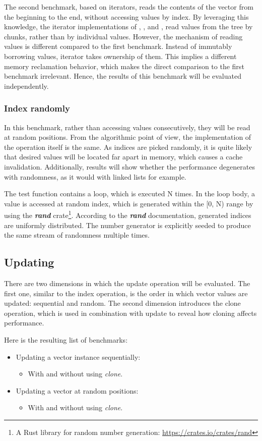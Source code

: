 The second benchmark, based on iterators, reads the contents of the vector from the beginning to the end, without accessing values by index. By leveraging this knowledge, the iterator implementations of \rbvec{}, \rrbvec{}, and \pvec{}, read values from the tree by chunks, rather than by individual values. However, the mechanism of reading values is different compared to the first benchmark. Instead of immutably borrowing values, iterator takes ownership of them. This implies a different memory reclamation behavior, which makes the direct comparison to the first benchmark irrelevant. Hence, the results of this benchmark will be evaluated independently. 

\subsubsection*{Index randomly}
In this benchmark, rather than accessing values consecutively, they will be read at random positions. From the algorithmic point of view, the implementation of the operation itself is the same. As indices are picked randomly, it is quite likely that desired values will be located far apart in memory, which causes a cache invalidation. Additionally, results will show whether the performance degenerates with randomness, as it would with linked lists for example. 

The test function contains a loop, which is executed N times. In the loop body, a value is accessed at random index, which is generated within the [0, N) range by using the \emph{\textbf{rand}} crate\footnote{A Rust library for random number generation: \url{https://crates.io/crates/rand}}. According to the \emph{\textbf{rand}} documentation, generated indices are uniformly distributed. The number generator is explicitly seeded to produce the same stream of randomness multiple times.

\subsection{Updating}
There are two dimensions in which the update operation will be evaluated. The first one, similar to the index operation, is the order in which vector values are updated: sequential and random. The second dimension introduces the clone operation, which is used in combination with update to reveal how cloning affects performance. 

Here is the resulting list of benchmarks:
\begin{itemize}
    \item Updating a vector instance sequentially:
    \begin{itemize}        
        \item With and without using \emph{clone}.
    \end{itemize}
    \item Updating a vector at random positions:
    \begin{itemize}
        \item With and without using \emph{clone}.
    \end{itemize}  
\end{itemize}

